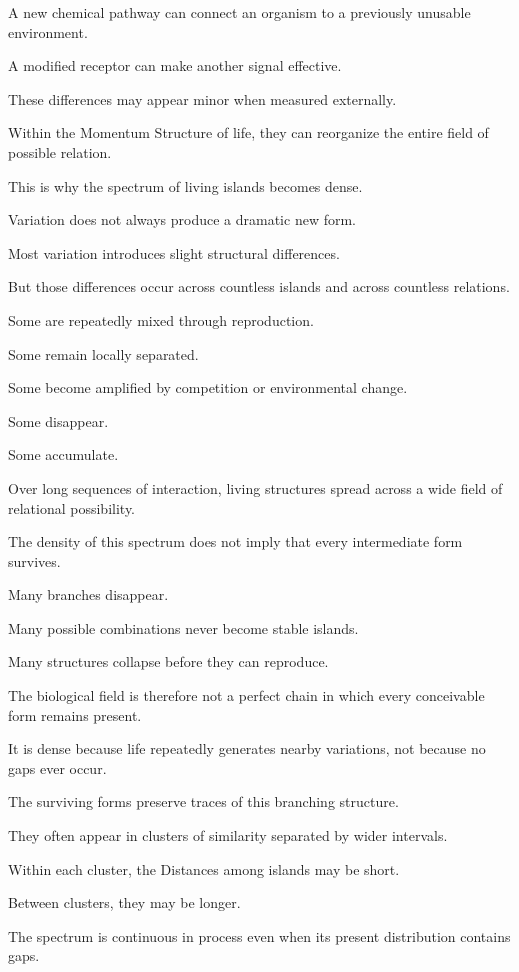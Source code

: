 A new chemical pathway can connect an organism to a previously unusable environment.

A modified receptor can make another signal effective.

These differences may appear minor when measured externally.

Within the Momentum Structure of life, they can reorganize the entire field of possible relation.

This is why the spectrum of living islands becomes dense.

Variation does not always produce a dramatic new form.

Most variation introduces slight structural differences.

But those differences occur across countless islands and across countless relations.

Some are repeatedly mixed through reproduction.

Some remain locally separated.

Some become amplified by competition or environmental change.

Some disappear.

Some accumulate.

Over long sequences of interaction, living structures spread across a wide field of relational possibility.

The density of this spectrum does not imply that every intermediate form survives.

Many branches disappear.

Many possible combinations never become stable islands.

Many structures collapse before they can reproduce.

The biological field is therefore not a perfect chain in which every conceivable form remains present.

It is dense because life repeatedly generates nearby variations, not because no gaps ever occur.

The surviving forms preserve traces of this branching structure.

They often appear in clusters of similarity separated by wider intervals.

Within each cluster, the Distances among islands may be short.

Between clusters, they may be longer.

The spectrum is continuous in process even when its present distribution contains gaps.

